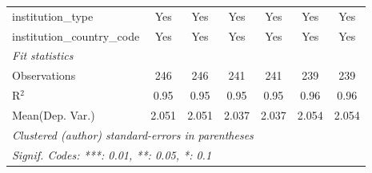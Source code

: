 \begin{tabular}{lcccccc}
   institution\_type                  & Yes     & Yes        & Yes     & Yes     & Yes       & Yes\\  
   institution\_country\_code         & Yes     & Yes        & Yes     & Yes     & Yes       & Yes\\  
   \midrule
   \emph{Fit statistics}\\
   Observations                       & 246     & 246        & 241     & 241     & 239       & 239\\  
   R$^2$                              & 0.95    & 0.95       & 0.95    & 0.95    & 0.96      & 0.96\\  
Mean(Dep. Var.) & 2.051 & 2.051 & 2.037 & 2.037 & 2.054 & 2.054 \\
   \midrule \midrule
   \multicolumn{7}{l}{\emph{Clustered (author) standard-errors in parentheses}}\\
   \multicolumn{7}{l}{\emph{Signif. Codes: ***: 0.01, **: 0.05, *: 0.1}}\\
\end{tabular}
\par\endgroup
